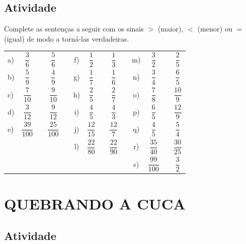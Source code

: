 \subsection{Atividade}


Complete as sentenças a seguir com os sinais $>$ (maior), $<$ (menor) ou $=$ (igual) de modo a torná-las verdadeiras. 

\begin{center}
\begin{tabular}{lccccccccccccc}
 a)  &  $\dfrac{3}{6}$     &   &  $\dfrac{5}{6}$   & \parbox[t][.6cm]{2cm}{ } \quad \quad\quad  & f)  &  $\dfrac{1}{2}$     &   &  $\dfrac{1}{3}$    & \quad \quad\quad  & m)  &  $\dfrac{3}{2}$     &   &  $\dfrac{2}{5}$    \\
 b)  &  $\dfrac{5}{9}$     &   &  $\dfrac{4}{9}$   & \parbox[t][.6cm]{2cm}{ }    & g)  &  $\dfrac{1}{7}$     &   &  $\dfrac{1}{6}$    &   & n)  &  $\dfrac{3}{4}$     &   &  $\dfrac{6}{5}$    \\
 c)  &  $\dfrac{7}{10}$    &   &  $\dfrac{9}{10}$   & \parbox[t][.6cm]{2cm}{ }   & h)  &  $\dfrac{2}{5}$     &   &  $\dfrac{2}{7}$    &   & o)  &  $\dfrac{7}{8}$     &   &  $\dfrac{10}{9}$   \\
 d)  &  $\dfrac{3}{12}$    &   &  $\dfrac{9}{12}$   & \parbox[t][.6cm]{2cm}{ }   & i)  &  $\dfrac{4}{5}$     &   &  $\dfrac{4}{3}$    &   & p)  &  $\dfrac{6}{5}$     &   &  $\dfrac{12}{9}$   \\
 e)  &  $\dfrac{39}{100}$  &   &  $\dfrac{25}{100}$ & \parbox[t][.6cm]{2cm}{ }   & j)  &  $\dfrac{12}{15}$   &   &  $\dfrac{12}{7}$   &   & q)  &  $\dfrac{4}{5}$     &   &  $\dfrac{5}{4}$    \\
     &&                     &    &                  \parbox[t][.6cm]{2cm}{ }    &  l)  &  $\dfrac{22}{80}$   &   &  $\dfrac{22}{90}$  &   & r)  &  $\dfrac{35}{40}$   &   &  $\dfrac{30}{25}$  \\
     &&                      &    &                    &      &  \parbox[t][.6cm]{2cm}{ }                    &   &                   &   &  s)  &  $\dfrac{99}{100}$  &   &  $\dfrac{3}{2}$    \\
\end{tabular} 
 \end{center}
 
\section{QUEBRANDO A CUCA }


\subsection{Atividade}

